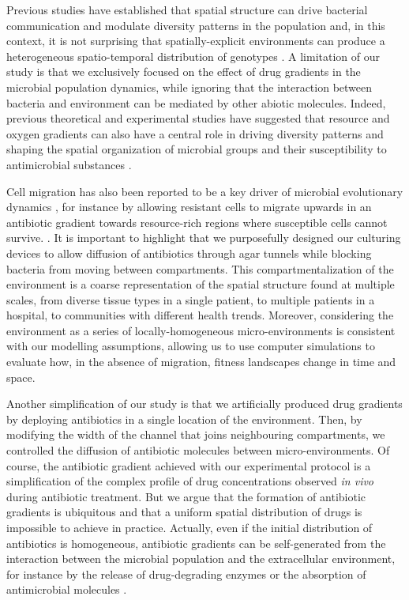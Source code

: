\documentclass[fleqn,12pt]{wlscirep}
\begin{document}
Previous studies have established that spatial structure can drive bacterial communication \cite{Kim2016} and modulate diversity patterns in the population \cite{Rainey1998} and, in this context, it is not surprising that spatially-explicit environments can produce a heterogeneous spatio-temporal distribution of genotypes \cite{Legrand2017}. 
A limitation of our study is that we exclusively focused on the effect of drug gradients in the microbial population dynamics, while ignoring that the interaction between bacteria and environment can be mediated by other abiotic molecules. Indeed, previous theoretical and experimental studies have suggested that resource\cite{Mitri2015} and oxygen \cite{Chen2017} gradients can also have a central role in driving diversity patterns and shaping the spatial organization of microbial groups and their susceptibility to antimicrobial substances \cite{Sinclair2019}.  

Cell migration has also been reported to be a key driver of microbial evolutionary dynamics \cite{Baym2016,Okamoto2018}, for instance by allowing resistant cells to migrate upwards in an antibiotic gradient towards resource-rich regions where susceptible cells cannot survive. \cite{Hermsen2012}. 
It is important to highlight that we purposefully designed our culturing devices to allow diffusion of antibiotics through agar tunnels while blocking bacteria from moving between compartments. This compartmentalization of the environment is a coarse representation of the spatial structure found at multiple scales, from diverse tissue types in a single patient, to multiple patients in a hospital, to communities with different health trends.  Moreover, considering the environment as a series of locally-homogeneous micro-environments is consistent with our modelling assumptions, allowing us to use computer simulations to evaluate how, in the absence of migration, fitness landscapes change in time and space.

Another simplification of our study is that we artificially produced drug gradients by deploying antibiotics in a single location of the environment.  Then, by modifying the width of the channel that joins neighbouring compartments, we controlled the diffusion of antibiotic molecules between micro-environments. Of course, the antibiotic gradient achieved with our experimental protocol is a simplification of the complex profile of drug concentrations observed {\em in vivo} during antibiotic treatment. But we argue that the formation of antibiotic gradients is ubiquitous and that a uniform spatial distribution of drugs is impossible to achieve in practice. Actually, even if the initial distribution of antibiotics is homogeneous, antibiotic gradients can be self-generated from the interaction between the microbial population and the extracellular environment, for instance by the release of drug-degrading enzymes \cite{Yurtsev2013} or the absorption of antimicrobial molecules \cite{Snoussi2018}.  
\end{document}
